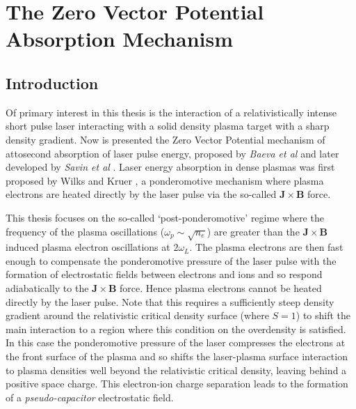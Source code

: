 \chapter{\label{ch:2-zvp}The Zero Vector Potential Absorption Mechanism}

\minitoc

\section{Introduction}
Of primary interest in this thesis is the interaction of a relativistically intense short pulse laser interacting with a solid density plasma target with a sharp density gradient. Now is presented the Zero Vector Potential mechanism of attosecond absorption of laser pulse energy, proposed by \textit{Baeva et al} \cite{baevaTheoryHighorderHarmonic2006} and later developed by \textit{Savin et al} \cite{savinAttosecondscaleAbsorptionExtreme2017,savinEnergyAbsorptionLaserQED2019}. Laser energy absorption in dense plasmas was first proposed by Wilks and Kruer \cite{wilksAbsorptionUltraIntenseLaser1992}, a ponderomotive mechanism where plasma electrons are heated directly by the laser pulse via the so-called $\mathbf{J}\times \mathbf{B}$ force.


This thesis focuses on the so-called `post-ponderomotive' regime where the frequency of the plasma oscillations ($\omega_p \sim \sqrt{n_e}$) are greater than the $\mathbf{J}\times \mathbf{B}$ induced plasma electron oscillations at $2\omega_L$. The plasma electrons are then fast enough to compensate the ponderomotive pressure of the laser pulse with the formation of electrostatic fields between electrons and ions and so respond adiabatically to the $\mathbf{J}\times \mathbf{B}$ force. Hence plasma electrons cannot be heated directly by the laser pulse. Note that this requires a sufficiently steep density gradient around the relativistic critical density surface (where $S=1$) to shift the main interaction to a region where this condition on the overdensity is satisfied. In this case the ponderomotive pressure of the laser compresses the electrons at the front surface of the plasma and so shifts the laser-plasma surface interaction to plasma densities well beyond the relativistic critical density, leaving behind a positive space charge. This electron-ion charge separation leads to the formation of a \textit{pseudo-capacitor} electrostatic field.


